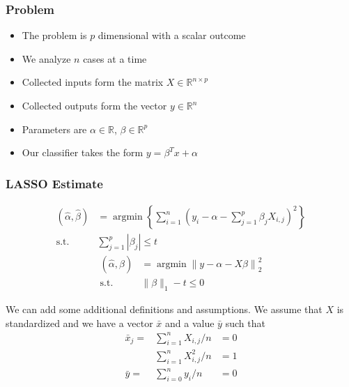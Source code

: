 \documentclass{beamer}
\DeclareMathOperator{\argmin}{argmin}
\begin{document}
\begin{frame}
\frametitle{Problem}
\begin{itemize}
    \item The problem is \(p\) dimensional with a scalar outcome
    \item We analyze \(n\) cases at a time
    \item Collected inputs form the matrix \(X \in \mathbb{R}^{n \times p}\)
    \item Collected outputs form the vector \(y \in \mathbb{R}^n\)
    \item Parameters are \(\alpha \in \mathbb{R}\), \(\beta \in \mathbb{R}^p\)
    \item Our classifier takes the form \(y = \beta^T x + \alpha\)
\end{itemize}
\end{frame}

\begin{frame}
\frametitle{LASSO Estimate}
\begin{equation}\label{eq:lasso estimate}
\begin{aligned}
(\hat{\alpha}, \hat{\beta}) &= \argmin \left\{ \sum_{i=1}^{n} \left(y_i-\alpha-\sum_{j=1}^p \beta_j X_{i,j}\right)^2 \right\} \\
\textrm{s.t.} &\sum^p_{j=1} |\beta_j| \leq t
\end{aligned}
\end{equation}
\begin{equation}\label{eq:lasso estimate compact}
\begin{aligned}
(\hat{\alpha}, \hat{\beta}) &= \argmin \left\|y-\alpha-X \beta\right\|^2_2 \\
\textrm{s.t.} &\|\beta\|_1 - t \leq 0
\end{aligned}
\end{equation}
\end{frame}

\begin{frame}
We can add some additional definitions and assumptions. We assume that \(X\) is standardized and we have a vector \(\bar{x}\) and a value \(\bar{y}\) such that
\begin{equation}\label{eq:lasso assumptions and defs}
\begin{aligned}
\bar{x}_j = &\sum_{i=1}^n X_{i, j} / n &= 0 \\
&\sum_{i=1}^n X_{i, j}^2 / n &= 1 \\
\bar{y} = &\sum_{i=0}^n y_i / n &= 0
\end{aligned}
\end{equation}
\end{frame}
\end{document}
